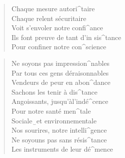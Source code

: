 \documentclass{leadsheet}
\begin{document}
\begin{song}
\begin{multicols}{2}
\begin{verse}
    Chaque mesure autori^taire \\
    Chaque relent sécuritaire \\
    Voit s'envoler notre confi^ance \\
    Ils font preuve de tant d'in sis^tance \\
    Pour confiner notre con^science \\
  \end{verse}
  \begin{chorus}[after-label=]\end{chorus}
  \begin{verse}
    Ne soyons pas impression^nables \\
    Par tous ces gens déraisonnables \\
    Vendeurs de peur en abon^dance \\
    Sachons les tenir à dis^tance \\

    Angoissants, jusqu'àl'indé^cence \\
    Pour notre santé men^tale \\
    Sociale‿et environnementale \\ 
    Nos sourires, notre intelli^gence \\
    Ne soyouns pas sans résis^tance \\
    Les instruments de leur dé^mence \\
  \end{verse}
  \begin{chorus}[after-label=]\end{chorus}
  \end{multicols}
\end{song}
\end{document}
